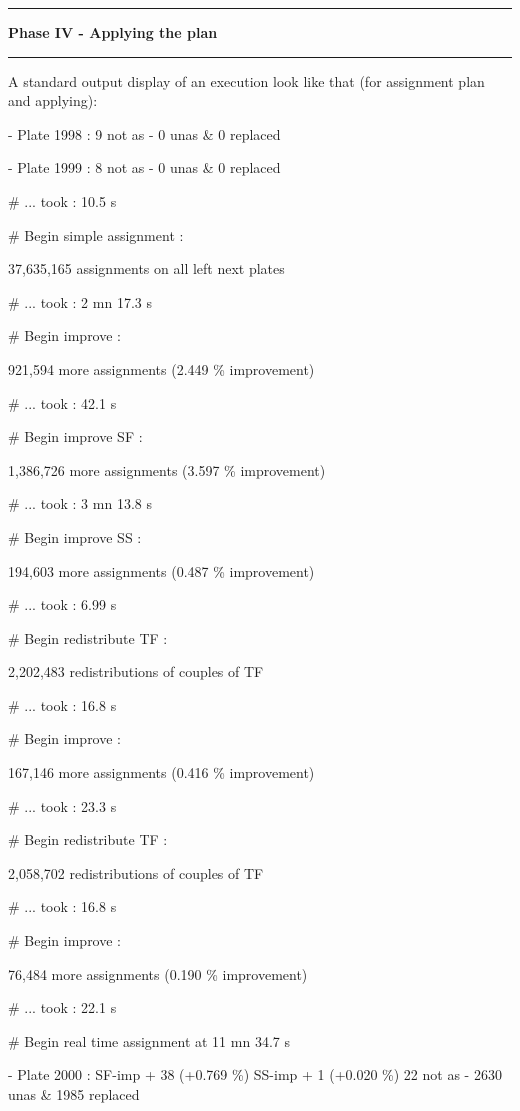 \documentclass{extarticle}
\newcommand\Algphase[1]{%
\vspace*{-.7\baselineskip}\Statex\hspace*{\dimexpr-\algorithmicindent-2pt\relax}\rule{\linewidth}{0.4pt}%
\Statex\hspace*{-\algorithmicindent}\textbf{#1}%
\vspace*{-.7\baselineskip}\Statex\hspace*{\dimexpr-\algorithmicindent-2pt\relax}\rule{\linewidth}{0.4pt}%
}
\begin{document}
\begin{multicols}{2}
\begin{algorithm}[H]
	\begin{algorithmic}[1]
		\Algphase{Phase IV - Applying the plan}
	\end{algorithmic}
\end{algorithm}


A standard output display of an execution look like that (for assignment plan and applying):
{\tt \small 

 - Plate 1998 :      9 not as -     0 unas \&    0 replaced

 - Plate 1999 :      8 not as -     0 unas \&    0 replaced

\# ... took : 10.5 s

\# Begin simple assignment :

  37,635,165 assignments on all left next plates

\# ... took : 2 mn 17.3 s

\# Begin improve :

  921,594 more assignments (2.449 \% improvement)

\# ... took : 42.1 s

\# Begin improve SF :

  1,386,726 more assignments (3.597 \% improvement)

\# ... took : 3 mn 13.8 s

\# Begin improve SS :

  194,603 more assignments (0.487 \% improvement)

\# ... took : 6.99 s

\# Begin redistribute TF :

  2,202,483 redistributions of couples of TF

\# ... took : 16.8 s

\# Begin improve :

  167,146 more assignments (0.416 \% improvement)

\# ... took : 23.3 s

\# Begin redistribute TF :

  2,058,702 redistributions of couples of TF

\# ... took : 16.8 s

\# Begin improve :

  76,484 more assignments (0.190 \% improvement)

\# ... took : 22.1 s

\# Begin real time assignment at 11 mn 34.7 s

 - Plate 2000 : SF-imp + 38 (+0.769 \%) SS-imp +  1 (+0.020 \%)    22 not as -  2630 unas \& 1985 replaced

}
\end{multicols}
\end{document}
